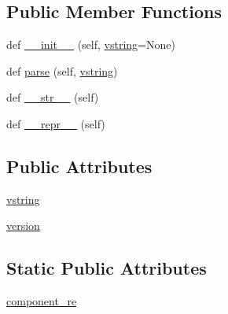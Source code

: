 \subsection*{Public Member Functions}
\begin{DoxyCompactItemize}
\item 
def \hyperlink{classsetuptools_1_1__distutils_1_1version_1_1LooseVersion_a07dc312ca7cc0b5fcbdc615ad76a5eea}{\+\_\+\+\_\+init\+\_\+\+\_\+} (self, \hyperlink{classsetuptools_1_1__distutils_1_1version_1_1LooseVersion_a601a1a7e7a2829b4e9973dab0c29d231}{vstring}=None)
\item 
def \hyperlink{classsetuptools_1_1__distutils_1_1version_1_1LooseVersion_adcf8a3c5dc01507b8613149959cda9a4}{parse} (self, \hyperlink{classsetuptools_1_1__distutils_1_1version_1_1LooseVersion_a601a1a7e7a2829b4e9973dab0c29d231}{vstring})
\item 
def \hyperlink{classsetuptools_1_1__distutils_1_1version_1_1LooseVersion_ad940d5dacb8c5b2462c3079feedce9c3}{\+\_\+\+\_\+str\+\_\+\+\_\+} (self)
\item 
def \hyperlink{classsetuptools_1_1__distutils_1_1version_1_1LooseVersion_a11b3c8a3459f4805615b29f2d3e79804}{\+\_\+\+\_\+repr\+\_\+\+\_\+} (self)
\end{DoxyCompactItemize}
\subsection*{Public Attributes}
\begin{DoxyCompactItemize}
\item 
\hyperlink{classsetuptools_1_1__distutils_1_1version_1_1LooseVersion_a601a1a7e7a2829b4e9973dab0c29d231}{vstring}
\item 
\hyperlink{classsetuptools_1_1__distutils_1_1version_1_1LooseVersion_a0b9ab20c415155f42a58b13cf95eec7e}{version}
\end{DoxyCompactItemize}
\subsection*{Static Public Attributes}
\begin{DoxyCompactItemize}
\item 
\hyperlink{classsetuptools_1_1__distutils_1_1version_1_1LooseVersion_a56bade2fde19e3304c99e8ca36c934cb}{component\+\_\+re}
\end{DoxyCompactItemize}


